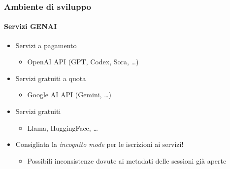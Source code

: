 \begin{frame}[t,fragile] \frametitle{Ambiente di sviluppo}
\framesubtitle{Servizi GENAI}
    \begin{itemize}
        \item[\alertedcircled{1}] Servizi a pagamento
        \begin{itemize}[leftmargin=20pt,align=right]
			\item[\alert{\faHandORight}] OpenAI API (GPT, Codex, Sora, \ldots)
        \end{itemize}
        \item[\alertedcircled{2}] Servizi gratuiti a quota
        \begin{itemize}[leftmargin=20pt,align=right]
			\item[\alert{\faHandORight}] Google AI API (Gemini, \ldots)
        \end{itemize}
        \item[\alertedcircled{3}] Servizi gratuiti
        \begin{itemize}[leftmargin=20pt,align=right]
			\item[\alert{\faHandORight}] Llama, HuggingFace, \ldots
        \end{itemize}        
    \end{itemize}
    \vfill
    \begin{itemize}
        \item[\alert{\faExclamationTriangle}] Consigliata la \textit{incognito mode} per le iscrizioni ai servizi!
        \begin{itemize}[leftmargin=20pt,align=right]
			\item[\alert{\faHandORight}] Possibili inconsistenze dovute ai metadati delle sessioni già aperte
        \end{itemize} 
    \end{itemize}
\end{frame}
%
